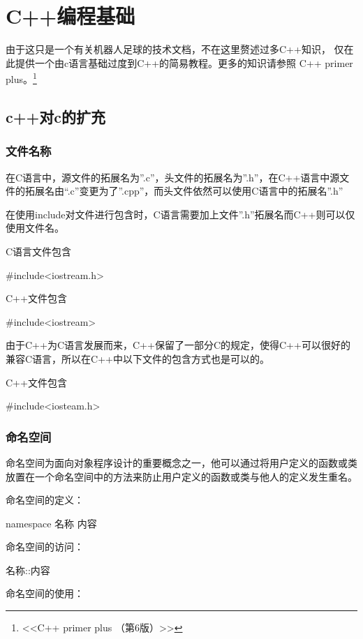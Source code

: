 \chapter{C++编程基础}

由于这只是一个有关机器人足球的技术文档，不在这里赘述过多C++知识，
仅在此提供一个由c语言基础过度到C++的简易教程。更多的知识请参照
C++ primer plus。\footnote{<<C++ primer plus （第6版）>> }
\section{c++对c的扩充}
\subsection{文件名称}
在C语言中，源文件的拓展名为”.c”，头文件的拓展名为”.h”，在C++语言中源文件的拓展名由“.c”变更为了”.cpp”，而头文件依然可以使用C语言中的拓展名”.h”

在使用include对文件进行包含时，C语言需要加上文件”.h”拓展名而C++则可以仅使用文件名。

C语言文件包含

\begin{Code}
#include<iostream.h>
\end{Code}

C++文件包含
\begin{Code}
#include<iostream>
\end{Code}

由于C++为C语言发展而来，C++保留了一部分C的规定，使得C++可以很好的兼容C语言，所以在C++中以下文件的包含方式也是可以的。

C++文件包含
\begin{Code}
#include<iosteam.h>
\end{Code}
\subsection{命名空间}
命名空间为面向对象程序设计的重要概念之一，他可以通过将用户定义的函数或类放置在一个命名空间中的方法来防止用户定义的函数或类与他人的定义发生重名。

命名空间的定义：

\begin{Code}
namespace 名称
{
	内容
}
\end{Code}

命名空间的访问：

\begin{Code}
名称::内容
\end{Code}

命名空间的使用：

